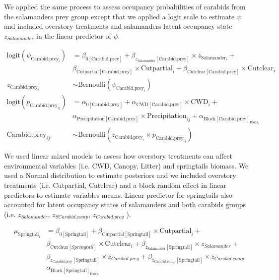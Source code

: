 We applied the same process to assess occupancy probabilities of carabids from the salamanders prey group except that we applied a logit scale to estimate $\psi$ 
and included overstory treatments and salamanders latent occupancy state $z_{Salamander}$ in the linear predictor of $\psi$.

\begin{align}
  \text{logit}(\psi_{\text{Carabid.prey}_i}) &= 
  \beta_{0[\text{Carabid.prey}]} + \beta_{z_{\text{Salamander}}[\text{Carabid.prey}]} \times z_{\text{Salamander}_i} + \nonumber \\
  &\beta_{\text{Cutpartial}[\text{Carabid.prey}]} \times \text{Cutpartial}_i + \beta_{\text{Cutclear}[\text{Carabid.prey}]} \times \text{Cutclear}_i \nonumber\\
  z_{\text{Carabid.prey}_i} &\sim 
  \text{Bernoulli}(\psi_{\text{Carabid.prey}_i}) \nonumber \\
  \text{logit}(p_{\text{Carabid.prey}_{ij}}) &= 
  \alpha_{0[\text{Carabid.prey}]} + \alpha_{\text{CWD}[\text{Carabid.prey}]} \times \text{CWD}_i +  \\
  &\alpha_{\text{Precipitation}[\text{Carabid.prey}]} \times \text{Precipitation}_{ij} + \alpha_{\text{Block}[\text{Carabid.prey}]_{\text{Block}_i}} \nonumber \\
  \text{Carabid.prey}_{ij} &\sim 
  \text{Bernoulli}(z_{\text{Carabid.prey}_i} \times p_{\text{Carabid.prey}_{ij}}) \nonumber
\end{align}

We used linear mixed models to assess how overstory treatments can affect environmental variables (i.e. CWD, Canopy, Litter) and springtails biomass. 
We used a Normal distribution to estimate posteriors and we included overstory treatments (i.e. Cutpartial, Cutclear) and a block random effect in linear predictors 
to estimate variables means. Linear predictor for springtails also accounted for latent occupancy states of salamanders and both carabids groups (i.e. $z_{Salamander}$, $z_{SCarabid.comp}$, $z_{Carabid.prey}$ ).

\begin{align}
  \mu_{\text{Springtail}_i} &=
  \beta_{0[\text{Springtail}]} + \beta_{\text{Cutpartial}[\text{Springtail}]} \times \text{Cutpartial}_i + \nonumber\\
  &\beta_{\text{Cutclear}[Springtail]} \times \text{Cutclear}_i + \beta_{z_{\text{Salamander}}[\text{Springtail}]} \times z_{Salamander} + \\
  &\beta_{z_{\text{Carabid.prey}}[\text{Springtail}]} \times z_{Carabid.prey} + \beta_{z_{\text{Carabid.comp}}[\text{Springtail}]} \times z_{Carabid.comp} \nonumber\\
  &\alpha_{\text{Block}[\text{Springtail}]_{\text{Block}_i}} \nonumber
\end{align}

